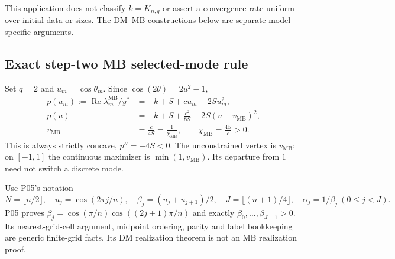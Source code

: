 \documentclass[11pt]{article}
\newcommand{\MB}{\mathrm{MB}}
\DeclareMathOperator{\Ree}{Re}
\theoremstyle{definition}
\theoremstyle{remark}
\begin{document}
This application does not classify $k=K_{n,q}$ or assert a convergence
rate uniform over initial data or sizes. The DM--MB constructions below
are separate model-specific arguments.

\subsection{Exact step-two MB selected-mode rule}
\label{slot:P08-2}
Set $q=2$ and $u_m=\cos\theta_m$. Since $\cos(2\theta)=2u^2-1$,
\begin{align}
 p(u_m):=\Ree\lambda_m^{\MB}/y^*&=-k+S+cu_m-2Su_m^2,
 \label{eq:P08-quadratic}\\
 p(u)&=-k+S+\frac{c^2}{8S}-2S(u-v_{\MB})^2,\nonumber\\
 v_{\MB}&=\frac{c}{4S}=\frac1{\chi_{\MB}},\qquad
 \chi_{\MB}=\frac{4S}{c}>0.\label{eq:P08-vertex}
\end{align}
This is always strictly concave, $p''=-4S<0$. The unconstrained vertex
is $v_{\MB}$; on $[-1,1]$ the continuous maximizer is
$\min(1,v_{\MB})$. Its departure from $1$ need not switch a discrete mode.

Use P05's notation
\[
 N=\lfloor n/2\rfloor,\quad u_j=\cos(2\pi j/n),\quad
 \beta_j=(u_j+u_{j+1})/2,\quad J=\lfloor(n+1)/4\rfloor,
 \quad\alpha_j=1/\beta_j\ (0\le j<J).
\]
P05 proves $\beta_j=\cos(\pi/n)\cos((2j+1)\pi/n)$ and exactly
$\beta_0,\ldots,\beta_{J-1}>0$. Its nearest-grid-cell argument,
midpoint ordering, parity and label bookkeeping are generic finite-grid
facts. Its DM realization theorem is not an MB realization proof.
\end{document}
